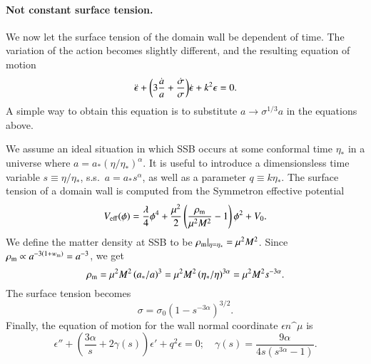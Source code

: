 





\begin{draft}

\paragraph{Not constant surface tension.} %
We now let the surface tension of the domain wall be dependent of time. The variation of the action becomes slightly different, and the resulting equation of motion
\begin{equation}
    \ddot{\epsilon} + {\left(  3\frac{\dot{a}}{a} + \frac{\dot{\sigma}}{\sigma}  \right)} \dot{\epsilon} + k^2 \epsilon = 0.
\end{equation}
A simple way to obtain this equation is to substitute $a\to \sigma^{1/3}a$ in the equations above.

We assume an ideal situation in which SSB occurs at some conformal time $\eta_\ast$ in a universe where $a= a_\ast (\eta/\eta_\ast)^\alpha$. It is useful to introduce a dimensionsless time variable $s\equiv\eta/\eta_\ast$, s.s.~$a=a_\ast s^\alpha$, as well as a parameter $q\equiv k\eta_\ast$. The surface tension of a domain wall is computed from the Symmetron effective potential
\begin{equation}
    V_\mathrm{eff} (\phi) = \frac{\lambda}{4} \phi^4 + \frac{\mu^2}{2} \left( \frac{\rho_\mathrm{m}}{\mu^2 M^2} - 1\right) \phi^2 + V_0.
\end{equation}
We define the matter density at SSB to be $\rho_\mathrm{m}|_{\eta=\eta_\ast}= \mu^2 M^2$. Since $\rho_\mathrm{m}\propto a^{-3(1+w_\mathrm{m})} = a^{-3}$, we get
\begin{equation}
    \rho_\mathrm{m} = \mu^2 M^2 \left(a_\ast/a \right)^3 = \mu^2 M^2 \left(\eta_\ast/\eta \right)^{3\alpha} = \mu^2 M^2 s^{-3\alpha}.
\end{equation}
\blahblah The surface tension becomes
\begin{equation}
    \sigma = \sigma_0 \left(1 - s^{-3\alpha}\right)^{3/2}.
\end{equation}
Finally, the equation of motion for the wall normal coordinate $\epsilon n\^\mu$ is
\begin{equation}\label{eq:pertwalls:untitled1:eom_final}
    \epsilon'' + \left(  \frac{3\alpha}{s}  + 2 \gamma(s)\right)\epsilon' + q^2\epsilon = 0; \quad \gamma(s)= \frac{9\alpha}{4 s \left( s^{3\alpha}-1 \right)}.
\end{equation}



\end{draft}
